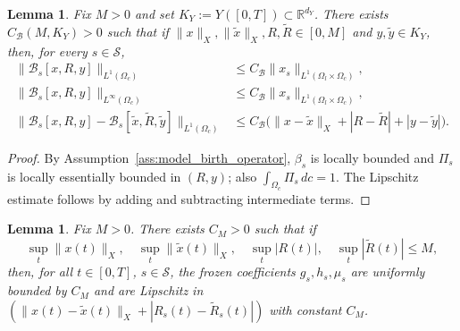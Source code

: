 \documentclass[pdflatex,sn-mathphys-num]{sn-jnl}%
\newtheorem{lemma}[theorem]{Lemma}
\begin{document}
\begin{lemma}\label{lem:wp_birth_bounds}
Fix \(M>0\) and set \(K_Y:=Y([0,T])\subset\mathbb R^{d_Y}\). There exists
\(C_{\mathcal B}(M,K_Y)>0\) such that if
\(\|x\|_X, \|\widetilde x\|_X, R, \widetilde R\in[0,M]\)
and \(y,\widetilde y\in K_Y\),
then, for every \(s\in\mathcal S\),
\begin{align}
\|\mathcal B_s[x,R,y]\|_{L^1(\Omega_c)}
&\le C_{\mathcal B}\|x_s\|_{L^1(\Omega_l\times\Omega_c)},
\label{eq:wp_B_L1}\\
\|\mathcal B_s[x,R,y]\|_{L^\infty(\Omega_c)}
&\le C_{\mathcal B}\|x_s\|_{L^1(\Omega_l\times\Omega_c)},
\label{eq:wp_B_Linfty}\\
\|\mathcal B_s[x,R,y]-\mathcal B_s[\widetilde x,\widetilde R,\widetilde y]\|_{L^1(\Omega_c)}
&\le
C_{\mathcal B}
\big(\|x-\widetilde x\|_X+|R-\widetilde R|+|y-\widetilde y|\big).
\label{eq:wp_B_Lip}
\end{align}
\end{lemma}
\begin{proof}
By Assumption~\ref{ass:model_birth_operator}, \(\beta_s\) is locally bounded and
\(\Pi_s\) is locally essentially bounded in \((R,y)\); also
\(\int_{\Omega_c}\Pi_s\,dc=1\).
The Lipschitz estimate follows by adding and subtracting intermediate terms.
\end{proof}

\begin{lemma}\label{lem:wp_coeff_bounds}
Fix \(M>0\). There exists \(C_M>0\) such that if
\[
\sup_{t}\|x(t)\|_X,\quad\sup_t\|\widetilde x(t)\|_X,\quad\sup_t|R(t)|,\quad\sup_t|\widetilde R(t)|\le M,
\]
then, for all \(t\in[0,T]\), \(s\in\mathcal S\),
the frozen coefficients \(g_s,h_s,\mu_s\) are uniformly bounded by \(C_M\) and are
Lipschitz in \((\|x(t)-\widetilde x(t)\|_X+|R_s(t)-\widetilde R_s(t)|)\) with constant
\(C_M\).
\end{lemma}
\end{document}
